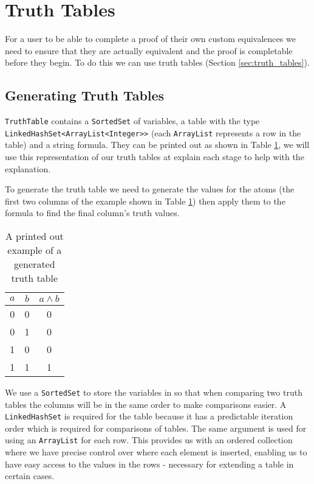 \documentclass[draft]{report}
\begin{document}
\section{Truth Tables}
\label{sec:generating_truth_tables}

For a user to be able to complete a proof of their own custom equivalences we need to ensure that they are actually equivalent and the proof is completable before they begin. To do this we can use truth tables (Section \ref{sec:truth_tables}).

\subsection{Generating Truth Tables}

{\tt TruthTable} contains a {\tt SortedSet} of variables, a table with the type {\tt LinkedHashSet<ArrayList<Integer>>} (each {\tt ArrayList} represents a row in the table) and a string formula. They can be printed out as shown in Table \ref{table:generated_truth_table}, we will use this representation of our truth tables at explain each stage to help with the explanation. 

To generate the truth table we need to generate the values for the atoms (the first two columns of the example shown in Table \ref{table:generated_truth_table}) then apply them to the formula to find the final column's truth values.

\begin{table}[h]
  \begin{center}
    \begin{tabular}{ | c | c || c | }
      \hline
      $a$ & $b$ & $a \land b$ \\ \hline
      0 & 0 & 0 \\
      0 & 1 & 0 \\
      1 & 0 & 0 \\
      1 & 1 & 1 \\
      \hline
    \end{tabular}
  \end{center}
  \caption{A printed out example of a generated truth table}
  \label{table:generated_truth_table}
\end{table}

We use a {\tt SortedSet} to store the variables in so that when comparing two truth tables the columns will be in the same order to make comparisons easier. A {\tt LinkedHashSet} is required for the table because it has a predictable iteration order which is required for comparisons of tables. The same argument is used for using an {\tt ArrayList} for each row. This provides us with an ordered collection where we have precise control over where each element is inserted, enabling us to have easy access to the values in the rows - necessary for extending a table in certain cases.
\end{document}
